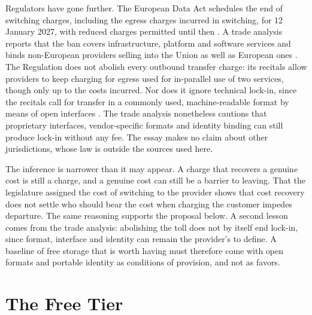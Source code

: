 \documentclass[11pt]{article}
\begin{document}
Regulators have gone further. The European Data Act schedules the end of switching charges, including the egress charges incurred in switching, for 12 January 2027, with reduced charges permitted until then \cite{dataact}. A trade analysis reports that the ban covers infrastructure, platform and software services and binds non-European providers selling into the Union as well as European ones \cite{cloudmagazin}. The Regulation does not abolish every outbound transfer charge: its recitals allow providers to keep charging for egress used for in-parallel use of two services, though only up to the costs incurred. Nor does it ignore technical lock-in, since the recitals call for transfer in a commonly used, machine-readable format by means of open interfaces \cite{dataact}. The trade analysis nonetheless cautions that proprietary interfaces, vendor-specific formats and identity binding can still produce lock-in without any fee. The essay makes no claim about other jurisdictions, whose law is outside the sources used here.

The inference is narrower than it may appear. A charge that recovers a genuine cost is still a charge, and a genuine cost can still be a barrier to leaving. That the legislature assigned the cost of switching to the provider shows that cost recovery does not settle who should bear the cost when charging the customer impedes departure. The same reasoning supports the proposal below. A second lesson comes from the trade analysis: abolishing the toll does not by itself end lock-in, since format, interface and identity can remain the provider's to define. A baseline of free storage that is worth having must therefore come with open formats and portable identity as conditions of provision, and not as favors.

\section{The Free Tier}
\end{document}
